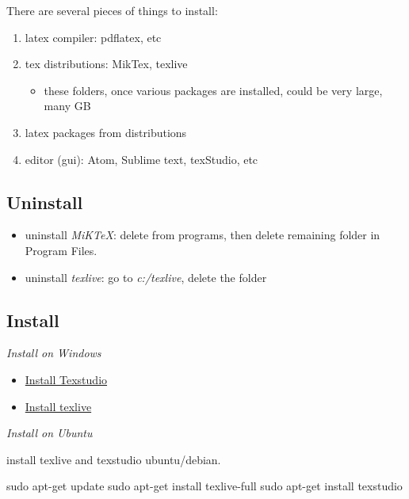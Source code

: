 \documentclass[]{article}
\newenvironment{Shaded}{\begin{snugshade}}{\end{snugshade}}
\newcommand{\FunctionTok}[1]{\textcolor[rgb]{0.00,0.00,0.00}{#1}}
\newcommand{\NormalTok}[1]{#1}
\providecommand{\tightlist}{%
  \setlength{\itemsep}{0pt}\setlength{\parskip}{0pt}}
\begin{document}
There are several pieces of things to install:

\begin{enumerate}
\def\labelenumi{\arabic{enumi}.}
\tightlist
\item
  latex compiler: pdflatex, etc
\item
  tex distributions: MikTex, texlive

  \begin{itemize}
  \tightlist
  \item
    these folders, once various packages are installed, could be very
    large, many GB
  \end{itemize}
\item
  latex packages from distributions
\item
  editor (gui): Atom, Sublime text, texStudio, etc
\end{enumerate}

\hypertarget{uninstall}{%
\subsection{Uninstall}\label{uninstall}}

\begin{itemize}
\tightlist
\item
  uninstall \emph{MiKTeX}: delete from programs, then delete remaining
  folder in Program Files.
\item
  uninstall \emph{texlive}: go to \emph{c:/texlive}, delete the folder
\end{itemize}

\hypertarget{install}{%
\subsection{Install}\label{install}}

\emph{Install on Windows}

\begin{itemize}
\tightlist
\item
  \href{https://www.texstudio.org/}{Install Texstudio}
\item
  \href{https://www.tug.org/texlive/acquire-netinstall.html}{Install
  texlive}
\end{itemize}

\emph{Install on Ubuntu}

install texlive and texstudio ubuntu/debian.

\begin{Shaded}
\begin{Highlighting}[]
\FunctionTok{sudo}\NormalTok{ apt-get update}
\FunctionTok{sudo}\NormalTok{ apt-get install texlive-full}
\FunctionTok{sudo}\NormalTok{ apt-get install texstudio}
\end{Highlighting}
\end{Shaded}
\end{document}
